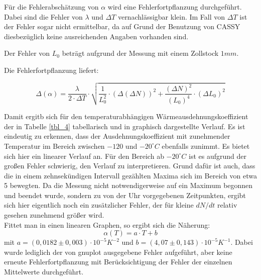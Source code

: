 Für die Fehlerabschätzung von $ \alpha $ wird eine Fehlerfortpflanzung durchgeführt.
Dabei sind die Fehler von $ \lambda $  und  $ \Delta T $ vernachlässigbar klein. Im Fall von $ \Delta T $ ist der Fehler sogar nicht ermittelbar, da auf Grund der Benutzung von CASSY diesbezüglich keine ausreichenden Angaben vorhanden sind.

Der Fehler von $ L_{0} $ beträgt aufgrund der Messung mit einem Zollstock $ 1 mm $.

Die Fehlerfortpflanzung liefert:

\begin{equation}
\Delta (\alpha) = \frac{\lambda}{2 \cdot \Delta T} \cdot \sqrt{\frac{1}{L_{0}^{2}} \cdot (\Delta(\Delta N))^{2} + \frac{(\Delta N)^{2}}{(L_{0})^{4}} \cdot (\Delta L_{0})^{2}}
\end{equation}


Damit ergitb sich für den temperaturabhängigen Wärmeausdehnungskoeffizient der in Tabelle \ref{tbl_4} tabellarisch und in 
graphisch dargestellte Verlauf. Es ist eindeutig zu erkennen, dass der Ausdehnungskoeffizient mit zunehmender Temperatur 
im Bereich zwischen $ -120 $ und $ - 20 ^{\circ} C $ ebenfalls zunimmt. Es bietet sich hier ein linearer Verlauf an.
Für den Bereich ab $ -20 ^{\circ} C $ ist es aufgrund der großen Fehler schwierig, den Verlauf zu interpretieren. Grund 
dafür ist auch, dass die in einem zehnsekündigen Intervall gezählten Maxima sich im Bereich von etwa 5 bewegten. Da die
Messung nicht notwendigerweise auf ein Maximum begonnen und beendet wurde, sondern zu von der Uhr vorgegebenen Zeitpunkten,
ergibt sich hier eigentlich noch ein zusätzlicher Fehler, der für kleine $dN/dt$ relativ gesehen 
zunehmend größer wird. \\
Fittet man in  einen linearen Graphen, so ergibt sich die Näherung:
\begin{equation}
\alpha(T) = a \cdot T + b 
\end{equation}
mit $ a = (0,0182 \pm 0,003) \cdot 10^{-5} K^{-2} $ und $ b = (4,07 \pm 0,143) \cdot 10^{-5} K^{-1} $. Dabei wurde lediglich
der von gnuplot ausgegebene Fehler aufgeführt, aber keine erneute Fehlerfortpflanzung mit Berücksichtigung der Fehler der einzelnen
Mittelwerte durchgeführt. 

